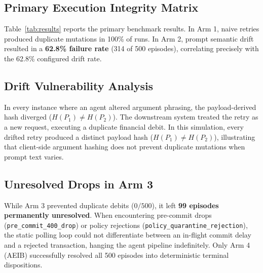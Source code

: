 \documentclass[10pt,journal,compsoc]{IEEEtran}
\begin{document}
\subsection{Primary Execution Integrity Matrix}
Table~\ref{tab:results} reports the primary benchmark results. In Arm 1, naive retries produced duplicate mutations in 100\% of runs. In Arm 2, prompt semantic drift resulted in a \textbf{62.8\% failure rate} (314 of 500 episodes), correlating precisely with the 62.8\% configured drift rate.

\subsection{Drift Vulnerability Analysis}
In every instance where an agent altered argument phrasing, the payload-derived hash diverged ($H(P_1) \neq H(P_2)$). The downstream system treated the retry as a new request, executing a duplicate financial debit. In this simulation, every drifted retry produced a distinct payload hash ($H(P_1) \neq H(P_2)$), illustrating that client-side argument hashing does not prevent duplicate mutations when prompt text varies.

\subsection{Unresolved Drops in Arm 3}
While Arm 3 prevented duplicate debits ($0/500$), it left \textbf{99 episodes permanently unresolved}. When encountering pre-commit drops (\texttt{pre\_commit\_400\_drop}) or policy rejections (\texttt{policy\_quarantine\_rejection}), the static polling loop could not differentiate between an in-flight commit delay and a rejected transaction, hanging the agent pipeline indefinitely. Only Arm 4 (AEIB) successfully resolved all 500 episodes into deterministic terminal dispositions.
\end{document}
